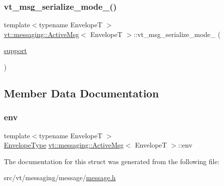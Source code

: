 \subsubsection{\texorpdfstring{vt\+\_\+msg\+\_\+serialize\+\_\+mode\+\_\+()}{vt\_msg\_serialize\_mode\_()}}
{\footnotesize\ttfamily template$<$typename EnvelopeT $>$ \\
\hyperlink{structvt_1_1messaging_1_1_active_msg}{vt\+::messaging\+::\+Active\+Msg}$<$ EnvelopeT $>$\+::vt\+\_\+msg\+\_\+serialize\+\_\+mode\+\_\+ (\begin{DoxyParamCaption}\item[{\hyperlink{namespacevt_1_1messaging_a436c5b9fc7f591e5978a136999cb9ef8a434990c8a25d2be94863561ae98bd682}{support}}]{ }\end{DoxyParamCaption})}



\subsection{Member Data Documentation}
\mbox{\label{structvt_1_1messaging_1_1_active_msg_ae3f8937b2c95f548f1a3c3340b887c09}} 
\subsubsection{\texorpdfstring{env}{env}}
{\footnotesize\ttfamily template$<$typename EnvelopeT $>$ \\
\hyperlink{structvt_1_1messaging_1_1_active_msg_a6e2b0541c25f7290555bf50d7cc05874}{Envelope\+Type} \hyperlink{structvt_1_1messaging_1_1_active_msg}{vt\+::messaging\+::\+Active\+Msg}$<$ EnvelopeT $>$\+::env}



The documentation for this struct was generated from the following file\+:\begin{DoxyCompactItemize}
\item 
src/vt/messaging/message/\hyperlink{message_2message_8h}{message.\+h}\end{DoxyCompactItemize}
